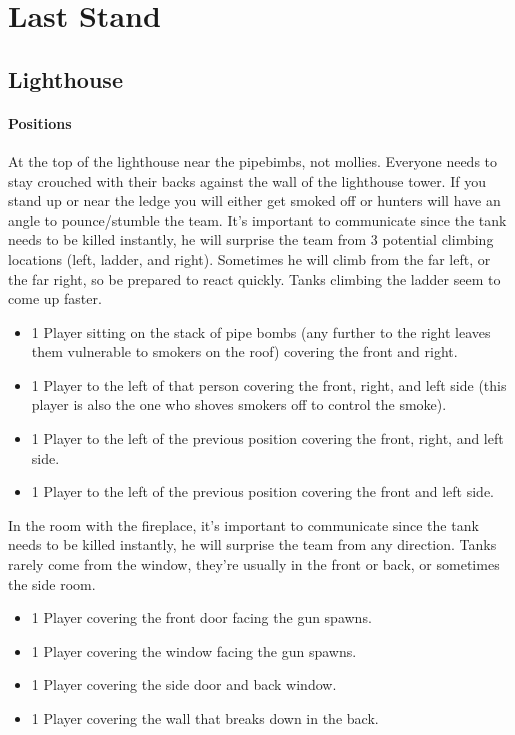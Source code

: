 \section{Last Stand}
\subsection{Lighthouse}
\paragraph{Positions}
At the top of the lighthouse near the pipebimbs, not mollies. Everyone needs to stay crouched with their backs against the wall of the lighthouse tower. If you stand up or near the ledge you will either get smoked off or hunters will have an angle to pounce/stumble the team. It’s important to communicate since the tank needs to be killed instantly, he will surprise the team from 3 potential climbing locations (left, ladder, and right). Sometimes he will climb from the far left, or the far right, so be prepared to react quickly. Tanks climbing the ladder seem to come up faster.
\begin{itemize}
\item 1 Player sitting on the stack of pipe bombs (any further to the right leaves them vulnerable to smokers on the roof) covering the front and right.
\item 1 Player to the left of that person covering the front, right, and left side (this player is also the one who shoves smokers off to control the smoke).
\item 1 Player to the left of the previous position covering the front, right, and left side.
\item 1 Player to the left of the previous position covering the front and left side.
\end{itemize}

In the room with the fireplace, it’s important to communicate since the tank needs to be killed instantly, he will surprise the team from any direction. Tanks rarely come from the window, they're usually in the front or back, or sometimes the side room.
\begin{itemize}
\item 1 Player covering the front door facing the gun spawns.
\item 1 Player covering the window facing the gun spawns.
\item 1 Player covering the side door and back window.
\item 1 Player covering the wall that breaks down in the back.
\end{itemize}

